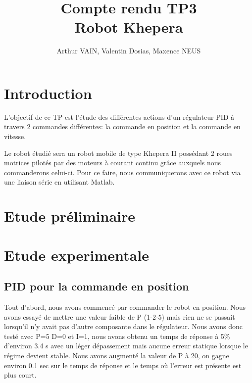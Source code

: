 \documentclass[a4paper]{article}
\begin{document}
	\title{\large{\textbf{Compte rendu TP3}}\\ Robot Khepera}
	\author{Arthur VAIN, Valentin Dosias, Maxence NEUS}
	\date{}
	
	\maketitle	
	\tableofcontents
	\newpage
	
	\section{Introduction}
	L'objectif de ce TP est l'étude des différentes actions d'un régulateur PID à travers 2 commandes différentes: la commande en position et la commande en vitesse.
	
	Le robot étudié sera un robot mobile de type Khepera II possédant 2 roues motrices pilotés par des moteurs à courant continu grâce auxquels nous commanderons celui-ci.
	Pour ce faire, nous communiquerons avec ce robot via une liaison série en utilisant Matlab.
	
	\section{Etude préliminaire}
	
	\section{Etude experimentale}
	\subsection{PID pour la commande en position}
		Tout d’abord, nous avons commencé par commander le robot en position.
		Nous avons essayé de mettre une valeur faible de P (1-2-5) mais rien ne se passait lorsqu’il n’y avait pas d’autre composante dans le régulateur. Nous avons donc testé avec P=5 D=0 et I=1, nous avons obtenu un temps de réponse à 5\% d’environ 3.4 s avec un léger dépassement mais aucune erreur statique lorsque le régime devient stable.
		Nous avons augmenté la valeur de P à 20, on gagne environ 0.1 sec sur le temps de réponse et le temps où l'erreur est présente est plus court.
		
\end{document}
